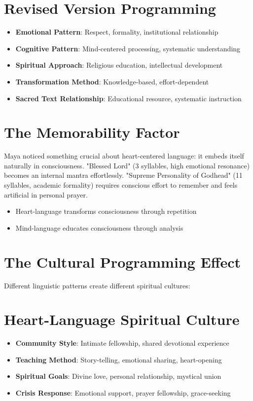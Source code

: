 \documentclass[11pt,twoside]{book}
\begin{document}
\section*{Revised Version Programming}
\label{sec:orgaae2e41}
\begin{itemize}
\item \textbf{\textbf{Emotional Pattern}}: Respect, formality, institutional relationship
\item \textbf{\textbf{Cognitive Pattern}}: Mind-centered processing, systematic understanding
\item \textbf{\textbf{Spiritual Approach}}: Religious education, intellectual development
\item \textbf{\textbf{Transformation Method}}: Knowledge-based, effort-dependent
\item \textbf{\textbf{Sacred Text Relationship}}: Educational resource, systematic instruction
\end{itemize}
\section*{The Memorability Factor}
\label{sec:orgfbdff5f}

Maya noticed something crucial about heart-centered language: it embeds itself naturally in consciousness. "Blessed Lord" (3 syllables, high emotional resonance) becomes an internal mantra effortlessly. "Supreme Personality of Godhead" (11 syllables, academic formality) requires conscious effort to remember and feels artificial in personal prayer.
\begin{itemize}
\item Heart-language transforms consciousness through repetition
\item Mind-language educates consciousness through analysis
\end{itemize}
\section*{The Cultural Programming Effect}
\label{sec:org6257506}

Different linguistic patterns create different spiritual cultures:
\section*{Heart-Language Spiritual Culture}
\label{sec:orgd08864e}
\begin{itemize}
\item \textbf{\textbf{Community Style}}: Intimate fellowship, shared devotional experience
\item \textbf{\textbf{Teaching Method}}: Story-telling, emotional sharing, heart-opening
\item \textbf{\textbf{Spiritual Goals}}: Divine love, personal relationship, mystical union
\item \textbf{\textbf{Crisis Response}}: Emotional support, prayer fellowship, grace-seeking
\end{itemize}
\end{document}
